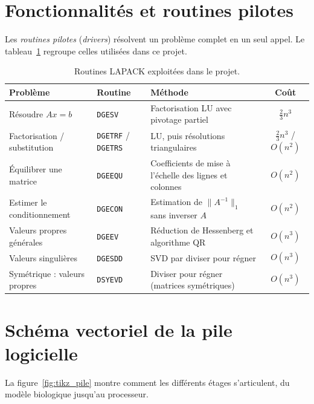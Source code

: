 \documentclass[11pt,a4paper]{report}
\theoremstyle{plain}
\theoremstyle{definition}
\theoremstyle{remark}
\begin{document}
\section{Fonctionnalités et routines pilotes}

Les \emph{routines pilotes} (\textit{drivers}) résolvent un problème complet en un seul appel. Le tableau~\ref{tab:lapack_routines} regroupe celles utilisées dans ce projet.

\begin{table}[ht]
\centering
\caption{Routines LAPACK exploitées dans le projet.}
\label{tab:lapack_routines}
\begin{tabularx}{\textwidth}{l l X c}
\toprule
\textbf{Problème} & \textbf{Routine} & \textbf{Méthode} & \textbf{Coût} \\
\midrule
Résoudre $Ax = b$ & \texttt{DGESV} & Factorisation LU avec pivotage partiel & $\frac{2}{3} n^3$ \\
Factorisation / substitution & \texttt{DGETRF} / \texttt{DGETRS} & LU, puis résolutions triangulaires & $\frac23 n^3$ / $O(n^2)$ \\
Équilibrer une matrice & \texttt{DGEEQU} & Coefficients de mise à l'échelle des lignes et colonnes & $O(n^2)$ \\
Estimer le conditionnement & \texttt{DGECON} & Estimation de $\|A^{-1}\|_1$ sans inverser $A$ & $O(n^2)$ \\
Valeurs propres générales & \texttt{DGEEV} & Réduction de Hessenberg et algorithme QR & $O(n^3)$ \\
Valeurs singulières & \texttt{DGESDD} & SVD par diviser pour régner & $O(n^3)$ \\
Symétrique : valeurs propres & \texttt{DSYEVD} & Diviser pour régner (matrices symétriques) & $O(n^3)$ \\
\bottomrule
\end{tabularx}
\end{table}

\section{Schéma vectoriel de la pile logicielle}

La figure~\ref{fig:tikz_pile} montre comment les différents étages s'articulent, du modèle biologique jusqu'au processeur.
\end{document}
